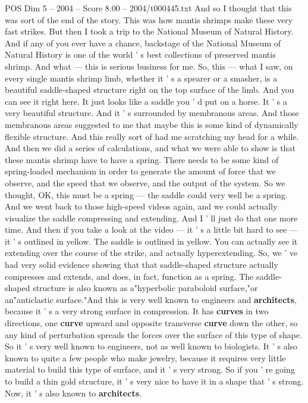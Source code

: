 \begin{textsample}{POS Dim 5 – 2004 – Score 8.00 – 2004/t000445.txt}
And so I thought that this was sort of the end of the story.
This was how mantis shrimps make these very fast strikes.
But then I took a trip to the National Museum of Natural History.
And if any of you ever have a chance, backstage of the National Museum of Natural History is one of the world ' s best collections of preserved mantis shrimp.
And what — this is serious business for me.
So, this — what I saw, on every single mantis shrimp limb, whether it ' s a spearer or a smasher, is a beautiful saddle-shaped structure right on the top surface of the limb.
And you can see it right here.
It just looks like a saddle you ' d put on a horse.
It ' s a very beautiful structure.
And it ' s surrounded by membranous areas.
And those membranous areas suggested to me that maybe this is some kind of dynamically flexible structure.
And this really sort of had me scratching my head for a while.
And then we did a series of calculations, and what we were able to show is that these mantis shrimp have to have a spring.
There needs to be some kind of spring-loaded mechanism in order to generate the amount of force that we observe, and the speed that we observe, and the output of the system.
So we thought, OK, this must be a spring — the saddle could very well be a spring.
And we went back to those high-speed videos again, and we could actually visualize the saddle compressing and extending.
And I ' ll just do that one more time.
And then if you take a look at the video — it ' s a little bit hard to see — it ' s outlined in yellow.
The saddle is outlined in yellow.
You can actually see it extending over the course of the strike, and actually hyperextending.
So, we ' ve had very solid evidence showing that that saddle-shaped structure actually compresses and extends, and does, in fact, function as a spring.
The saddle-shaped structure is also known as a"hyperbolic paraboloid surface,"or an"anticlastic surface."And this is very well known to engineers and \textbf{architects}, because it ' s a very strong surface in compression.
It has \textbf{curves} in two directions, one \textbf{curve} upward and opposite transverse \textbf{curve} down the other, so any kind of perturbation spreads the forces over the surface of this type of shape.
So it ' s very well known to engineers, not as well known to biologists.
It ' s also known to quite a few people who make jewelry, because it requires very little material to build this type of surface, and it ' s very strong.
So if you ' re going to build a thin gold structure, it ' s very nice to have it in a shape that ' s strong.
Now, it ' s also known to \textbf{architects}.

\end{textsample}

